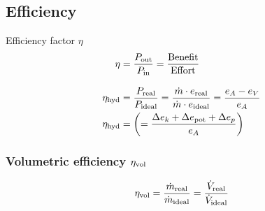 \documentclass{article}
\begin{document}
\begin{multicols}{2}
\subsection{Efficiency}
\begin{theorybox}{Efficiency factor $\eta$}
    \begin{align}
        \eta &= \frac{P_{\rm out}}{P_{\rm in}} = \frac{\rm Benefit}{\rm Effort}\\[2ex]
        \eta_{\rm hyd} &= \frac{P_{\rm real}}{P_{\rm ideal}} = \frac{\dot{m} \cdot e_{\rm real}}{\dot{m} \cdot e_{\rm ideal}} = \frac{e_A - e_V}{e_A} \notag\\
        \eta_{\rm hyd} &= \left(= \frac{\Delta e_k + \Delta e_{\rm pot} + \Delta e_p}{e_A}\right)
    \end{align}

    \subsubsection{Volumetric efficiency $\eta_{\rm vol}$}
    \begin{equation}
        \eta_{\rm vol} = \frac{\dot{m}_{\rm real}}{\dot{m}_{\rm ideal}} = \frac{\dot{V}_{\rm real}}{\dot{V}_{\rm ideal}}
    \end{equation}
\end{theorybox}

\vfill
\phantom{}
\end{multicols}
\end{document}
